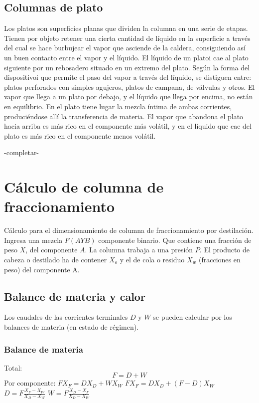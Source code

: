 \documentclass[11pt,openany]{book}
\begin{document}
\subsection{Columnas de plato}
Los platos son superficies planas que dividen la columna en una serie de etapas.
Tienen por objeto retener una cierta cantidad de líquido en la superficie a través del cual se hace 
burbujear el vapor que asciende de la caldera, consiguiendo así un buen contacto entre el vapor y el líquido.
El líquido de un platoi cae al plato siguiente por un rebosadero situado en un extremo del plato.
Según la forma del dispositivoi que permite el paso del vapor a través del líquido, se distiguen entre:
platos perforados con simples agujeros, platos de campana, de válvulas y otros.
El vapor que llega a un plato por debajo, y el líquido que llega por encima, no están en equilibrio. 
En el plato tiene lugar la mezcla íntima de ambas corrientes, produciéndose allí la transferencia de materia.
El vapor que abandona el plato hacia arriba es más rico en el componente más volátil, y en el líquido que 
cae del plato es más rico en el componente menos volátil. 

-completar-

\section{Cálculo de columna de fraccionamiento}
Cálculo para el dimensionamiento de columna de fraccionamiento por destilación.
Ingresa una mezcla $F(A Y B)$ componente binario. Que contiene una fracción de peso $X$,
del componente $A$.
La columna trabaja a una presión $P$.
El producto de cabeza o destilado ha de contener $X_o$ y el de cola o residuo $X_w$
(fracciones en peso) del componente A.

\subsection{Balance de materia y calor}
Los caudales de las corrientes terminales $D$ y $W$ se pueden calcular por los balances de materia 
(en estado de régimen).

\subsubsection{Balance de materia}
Total: 
\begin{equation}
\boxed{F=D+W}
\end{equation}
\newline\newline
Por componente: $F X_F = D X_D + W X_W$
\newline\newline
$F X_F = D X_D + (F-D) X_W$
\newline\newline
$D=F \frac{X_F - X_W}{X_D-X_W}$
\newline\newline
$W=F \frac{X_D - X_F}{X_D-X_W}$
\end{document}
